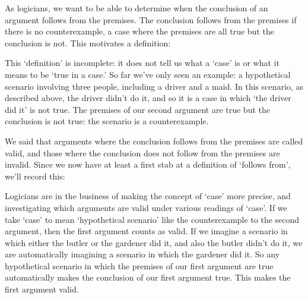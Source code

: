 \documentclass[PHIL101-Textbook.tex]{subfiles}
\begin{document}
As logicians, we want to be able to determine when the conclusion of an argument follows from the premises. The conclusion follows from the premises if there is no counterexample, a case where the premises are all true but the conclusion is not. This motivates a definition:


This `definition' is incomplete: it does not tell us what a `case' is or what it means to be `true in a case.' So far we've only seen an example: a hypothetical scenario involving three people, including a driver and a maid. In this scenario, as described above, the driver didn't do it, and so it is a case in which `the driver did it' is not true. The premises of our second argument are true but the conclusion is not true: the scenario is a counterexample.

We said that arguments where the conclusion follows from the premises are called valid, and those where the conclusion does not follow from the premises are invalid. Since we now have at least a first stab at a definition of `follows from', we'll record this: 




Logicians are in the business of making the concept of `case' more precise, and investigating which arguments are valid under various readings of `case'. If we take `case' to mean `hypothetical scenario' like the counterexample to the second argument, then the first argument counts as valid. If we imagine a scenario in which either the butler or the gardener did it, and also the butler didn't do it, we are automatically imagining a scenario in which the gardener did it. So any hypothetical scenario in which the premises of our first argument are true automatically makes the conclusion of our first argument true. This makes the first argument valid. 
\end{document}

